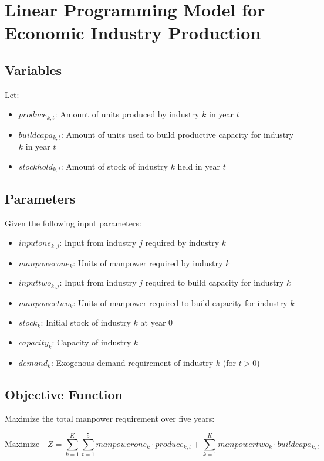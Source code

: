 \documentclass{article}
\begin{document}
\section*{Linear Programming Model for Economic Industry Production}

\subsection*{Variables}
Let:
\begin{itemize}
    \item \( produce_{k, t} \): Amount of units produced by industry \( k \) in year \( t \)
    \item \( buildcapa_{k, t} \): Amount of units used to build productive capacity for industry \( k \) in year \( t \)
    \item \( stockhold_{k, t} \): Amount of stock of industry \( k \) held in year \( t \)
\end{itemize}

\subsection*{Parameters}
Given the following input parameters:
\begin{itemize}
    \item \( inputone_{k, j} \): Input from industry \( j \) required by industry \( k \)
    \item \( manpowerone_{k} \): Units of manpower required by industry \( k \)
    \item \( inputtwo_{k, j} \): Input from industry \( j \) required to build capacity for industry \( k \)
    \item \( manpowertwo_{k} \): Units of manpower required to build capacity for industry \( k \)
    \item \( stock_{k} \): Initial stock of industry \( k \) at year 0
    \item \( capacity_{k} \): Capacity of industry \( k \)
    \item \( demand_{k} \): Exogenous demand requirement of industry \( k \) (for \( t > 0 \))
\end{itemize}

\subsection*{Objective Function}
Maximize the total manpower requirement over five years:

\[
\text{Maximize} \quad Z = \sum_{k=1}^{K} \sum_{t=1}^{5} manpowerone_k \cdot produce_{k, t} + \sum_{k=1}^{K} manpowertwo_k \cdot buildcapa_{k, t}
\]
\end{document}
